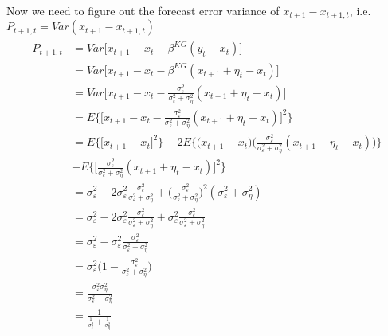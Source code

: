 \documentclass[14pt]{article}
\begin{document}
{\begin{enumerate}
	Now we need to figure out the forecast error variance of $x_{t+1} - x_{t+1,t}$, i.e. $P_{t+1,t} = Var(x_{t+1} - x_{t+1,t})$
	\begin{eqnarray}
	\begin{aligned}
	P_{t+1,t} &= Var \bigg[ x_{t+1} - x_{t} -  \beta^{KG} (y_t - x_{t}) \bigg] \\
	&= Var \bigg[ x_{t+1} - x_{t} -  \beta^{KG} (x_{t+1} + \eta_t -  x_{t}) \bigg] \\
	&= Var \bigg[ x_{t+1} - x_{t} -  \frac{\sigma^2_{\varepsilon}}{\sigma^2_{\varepsilon} + \sigma^2_{\eta}} (x_{t+1} + \eta_t -  x_{t}) \bigg] \\
	&= E \bigg\{  \bigg[ x_{t+1} - x_{t} -  \frac{\sigma^2_{\varepsilon}}{\sigma^2_{\varepsilon} + \sigma^2_{\eta}} (x_{t+1} + \eta_t -  x_{t}) \bigg]^2 \bigg\} \\
		&= E \bigg\{  \bigg[ x_{t+1} - x_{t} \bigg]^2 \bigg\} -2 E \bigg\{ \bigg(  x_{t+1} - x_{t} \bigg) \bigg( \frac{\sigma^2_{\varepsilon}}{\sigma^2_{\varepsilon} + \sigma^2_{\eta}} (x_{t+1} + \eta_t -  x_{t})  \bigg) \bigg\} \\
		&+ E \bigg\{  \bigg[ \frac{\sigma^2_{\varepsilon}}{\sigma^2_{\varepsilon} + \sigma^2_{\eta}} (x_{t+1} + \eta_t -  x_{t}) \bigg]^2 \bigg\} \\
		&= \sigma^2_{\varepsilon} - 2   \sigma^2_{\varepsilon} \frac{ \sigma^2_{\varepsilon}}{ \sigma^2_{\varepsilon} + \sigma^2_{\eta}} +  \bigg( \frac{ \sigma^2_{\varepsilon}}{ \sigma^2_{\varepsilon} + \sigma^2_{\eta}} \bigg)^2 (\sigma^2_{\varepsilon} + \sigma^2_{\eta}) \\
		&= \sigma^2_{\varepsilon} - 2   \sigma^2_{\varepsilon} \frac{ \sigma^2_{\varepsilon}}{ \sigma^2_{\varepsilon} + \sigma^2_{\eta}} +   \sigma^2_{\varepsilon} \frac{ \sigma^2_{\varepsilon}}{ \sigma^2_{\varepsilon} + \sigma^2_{\eta}}   \\
		&= \sigma^2_{\varepsilon} -   \sigma^2_{\varepsilon} \frac{ \sigma^2_{\varepsilon}}{ \sigma^2_{\varepsilon} + \sigma^2_{\eta}}  \\
		&= \sigma^2_{\varepsilon} \bigg( 1 -  \frac{ \sigma^2_{\varepsilon}}{ \sigma^2_{\varepsilon} + \sigma^2_{\eta}}  \bigg) \\
		&= \frac{\sigma^2_{\varepsilon} \sigma^2_{\eta}}{ \sigma^2_{\varepsilon} + \sigma^2_{\eta}}  \\
		&= \frac{1}{ \frac{1}{\sigma^2_{\varepsilon}} + \frac{1}{\sigma^2_{\eta}}}  \\		
	\end{aligned}
	\end{eqnarray}
	



\end{enumerate}


}
\end{document}
